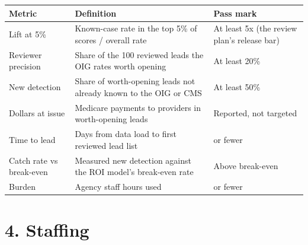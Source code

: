 \documentclass[letterpaper,11pt]{article}
\begin{document}
\begingroup\small\setlength{\tabcolsep}{4pt}\renewcommand{\arraystretch}{1.25}
\begin{longtable}[l]{@{}>{\raggedright\arraybackslash}p{}>{\raggedright\arraybackslash}p{}>{\raggedright\arraybackslash}p{}@{}}
\rowcolor{coolblack}\leavevmode\color{white}\bfseries Metric & \leavevmode\color{white}\bfseries Definition & \leavevmode\color{white}\bfseries Pass mark \\
\endhead
Lift at 5\% & Known-case rate in the top 5\% of scores / overall rate & At least 5x (the review plan's release bar) \\
Reviewer precision & Share of the 100 reviewed leads the OIG rates worth opening & At least 20\% \\
New detection & Share of worth-opening leads not already known to the OIG or CMS & At least 50\% \\
Dollars at issue & Medicare payments to providers in worth-opening leads & Reported, not targeted \\
Time to lead & Days from data load to first reviewed lead list & 45 or fewer \\
Catch rate vs break-even & Measured new detection against the ROI model's break-even rate & Above break-even \\
Burden & Agency staff hours used & 80 or fewer \\
\end{longtable}\endgroup

\hypertarget{staffing}{%
\section*{4. Staffing}\label{staffing}}
\end{document}
